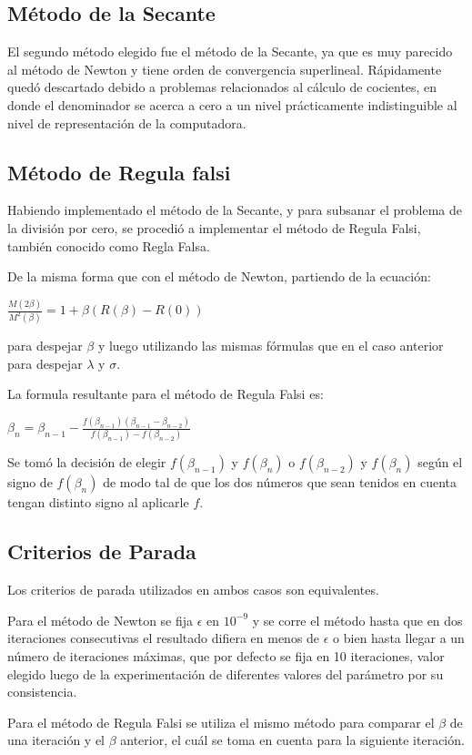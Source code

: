 \subsection{M\'etodo de la Secante}

El segundo m\'etodo elegido fue el m\'etodo de la Secante, ya que es muy parecido al m\'etodo de Newton y tiene orden de convergencia superlineal. R\'apidamente qued\'o descartado debido a problemas relacionados al c\'alculo de cocientes, en donde el denominador se acerca a cero a un nivel pr\'acticamente indistinguible al nivel de representaci\'on de la computadora.

\subsection{M\'etodo de Regula falsi}

Habiendo implementado el m\'etodo de la Secante, y para subsanar el problema de la divisi\'on por cero, se procedi\'o a implementar el m\'etodo de Regula Falsi, tambi\'en conocido como Regla Falsa.

De la misma forma que con el m\'etodo de Newton, partiendo de la ecuaci\'on:

$\frac{M(2\beta)}{M^2(\beta)}=1 + \beta(R(\beta)-R(0))$

para despejar $\beta$ y luego utilizando las mismas f\'ormulas que en el caso anterior para despejar $\lambda$ y $\sigma$.

La formula resultante para el m\'etodo de Regula Falsi es:

$\beta_n = \beta_{n-1} - \frac{f(\beta_{n-1}) (\beta_{n-1}-\beta_{n-2})}{f(\beta_{n-1}) - f(\beta_{n-2})}$

Se tom\'o la decisi\'on de elegir $f(\beta_{n-1})$ y $f(\beta_n)$ o $f(\beta_{n-2})$ y $f(\beta_n)$ seg\'un el signo de $f(\beta_n)$ de modo tal de que los dos n\'umeros que sean tenidos en cuenta tengan distinto signo al aplicarle $f$.

\subsection{Criterios de Parada}

Los criterios de parada utilizados en ambos casos son equivalentes.

Para el m\'etodo de Newton se fija $\epsilon$ en $10^{-9}$ y se corre el m\'etodo hasta que en dos iteraciones consecutivas el resultado difiera en menos de $\epsilon$ o bien hasta llegar a un n\'umero de iteraciones m\'aximas, que por defecto se fija en 10 iteraciones, valor elegido luego de la experimentaci\'on de diferentes valores del par\'ametro por su consistencia.

Para el m\'etodo de Regula Falsi se utiliza el mismo m\'etodo para comparar el $\beta$ de una iteraci\'on y el $\beta$ anterior, el cu\'al se toma en cuenta para la siguiente iteraci\'on.
